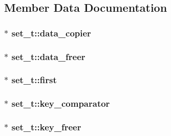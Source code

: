 \subsection{Member Data Documentation}
\hypertarget{structset__t_a24df0e4b94fc3121afc5959251ad90cf}{
\subsubsection[{data\-\_\-copier}]{$\ast$ set\-\_\-t\-::data\-\_\-copier}}\label{structset__t_a24df0e4b94fc3121afc5959251ad90cf}
\hypertarget{structset__t_ae067344927bedd2282648a3896918840}{
\subsubsection[{data\-\_\-freer}]{$\ast$ set\-\_\-t\-::data\-\_\-freer}}\label{structset__t_ae067344927bedd2282648a3896918840}
\hypertarget{structset__t_a705edb15a880132b3a21c44213e237a6}{
\subsubsection[{first}]{$\ast$ set\-\_\-t\-::first}}\label{structset__t_a705edb15a880132b3a21c44213e237a6}
\hypertarget{structset__t_a1589eb9c56fe70bc85308a2ec215d44a}{
\subsubsection[{key\-\_\-comparator}]{$\ast$ set\-\_\-t\-::key\-\_\-comparator}}\label{structset__t_a1589eb9c56fe70bc85308a2ec215d44a}
\hypertarget{structset__t_a1dd139162c66b60feb9934f8433c6057}{
\subsubsection[{key\-\_\-freer}]{$\ast$ set\-\_\-t\-::key\-\_\-freer}}\label{structset__t_a1dd139162c66b60feb9934f8433c6057}

